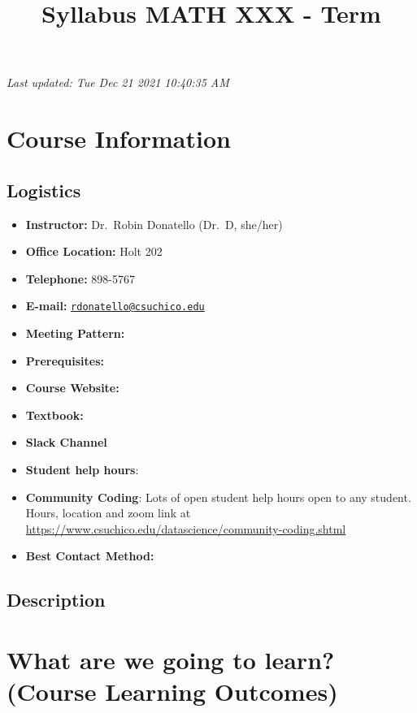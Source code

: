 \documentclass[
]{article}
\title{Syllabus MATH XXX - Term}
\author{}
\date{\vspace{-2.5em}}
\providecommand{\tightlist}{%
  \setlength{\itemsep}{0pt}\setlength{\parskip}{0pt}}
\begin{document}
\maketitle

{
\setcounter{tocdepth}{2}
\tableofcontents
}
\emph{Last updated: Tue Dec 21 2021 10:40:35 AM}

\hypertarget{course-information}{%
\section{Course Information}\label{course-information}}

\hypertarget{logistics}{%
\subsection{Logistics}\label{logistics}}

\begin{itemize}
\tightlist
\item
  \textbf{Instructor:} Dr.~Robin Donatello (Dr.~D, she/her)
\item
  \textbf{Office Location:} Holt 202
\item
  \textbf{Telephone:} 898-5767
\item
  \textbf{E-mail:}
  \href{mailto:rdonatello@csuchico.edu}{\nolinkurl{rdonatello@csuchico.edu}}
\item
  \textbf{Meeting Pattern:}
\item
  \textbf{Prerequisites:}
\item
  \textbf{Course Website:}
\item
  \textbf{Textbook:}
\item
  \textbf{Slack Channel}
\item
  \textbf{Student help hours}:
\item
  \textbf{Community Coding}: Lots of open student help hours open to any
  student. Hours, location and zoom link at
  \url{https://www.csuchico.edu/datascience/community-coding.shtml}
\item
  \textbf{Best Contact Method:}
\end{itemize}

\hypertarget{description}{%
\subsection{Description}\label{description}}

\hypertarget{co}{%
\section{What are we going to learn? (Course Learning
Outcomes)}\label{co}}
\end{document}
